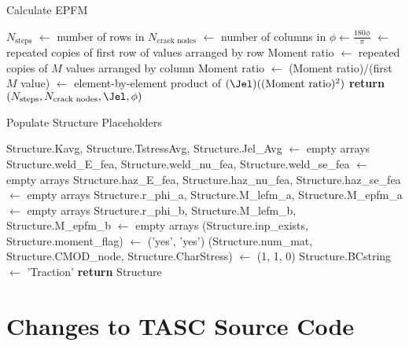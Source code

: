 \begin{algorithm}[tbp]
  \caption{Calculate EPFM}
  \label{alg:calculate_epfm}
  \begin{algorithmic}
    \State \(N_\text{steps}\) $\gets$ number of rows in \J
    \State \(N_\text{crack nodes}\) $\gets$ number of columns in \J
    \State \(\phi \gets \frac{180\phi}{\pi}\) 
    \State \Jel $\gets$ repeated copies of first row of \J values arranged by row
    \State Moment ratio $\gets$ repeated copies of \(M\) values arranged by column
    \State Moment ratio $\gets$ (Moment ratio)/(first \(M\) value)
    \State {}
    \State \Jel $\gets$ element-by-element product of \((\Jel)((\text{Moment ratio})^2)\)
    \State \textbf{return} \((N_\text{steps}, N_\text{crack nodes}, \Jel, \phi)\)
    \EndProcedure
  \end{algorithmic}
\end{algorithm}

\begin{algorithm}[tbp]
  \caption{Populate Structure Placeholders}
  \label{alg:populate_structure_placeholders}
  \begin{algorithmic}
    \State Structure.Kavg, Structure.TstressAvg, Structure.Jel\_Avg $\gets$ empty arrays
    \State Structure.weld\_E\_fea, Structure.weld\_nu\_fea, Structure.weld\_se\_fea  $\gets$ empty arrays
    \State Structure.haz\_E\_fea, Structure.haz\_nu\_fea, Structure.haz\_se\_fea $\gets$ empty arrays
    \State Structure.r\_phi\_a, Structure.M\_lefm\_a, Structure.M\_epfm\_a $\gets$ empty arrays
    \State Structure.r\_phi\_b, Structure.M\_lefm\_b, Structure.M\_epfm\_b $\gets$ empty arrays
    \State (Structure.inp\_exists, Structure.moment\_flag) $\gets$ ('yes', 'yes')
    \State (Structure.num\_mat, Structure.CMOD\_node, Structure.CharStress) $\gets$ (1, 1, 0)
    \State Structure.BCstring $\gets$ 'Traction'
    \State \textbf{return} Structure
    \EndProcedure
  \end{algorithmic}
\end{algorithm}

\section{Changes to TASC Source Code}
\label{sec:changes_tasc_source}

